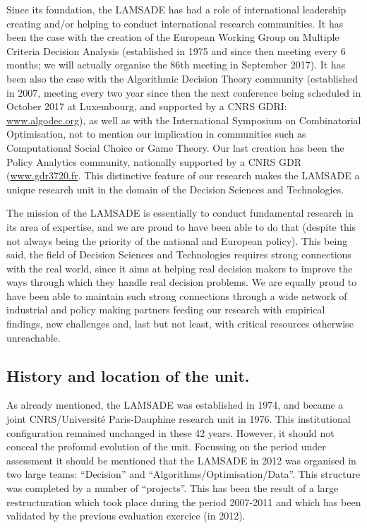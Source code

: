 Since its foundation, the LAMSADE has had a role of international leadership creating and/or helping to conduct international research communities. It has been the case with the creation of the European Working Group on Multiple Criteria Decision Analysis (established in 1975 and since then meeting every 6 months; we will actually organise the 86th meeting in September 2017). It has been also the case with the Algorithmic Decision Theory community (established in 2007,  meeting every two year since then the next conference being scheduled in October 2017 at Luxembourg, and supported by a CNRS GDRI: \url{www.algodec.org}), as well as with the International Symposium on Combinatorial Optimisation, not to mention our implication in communities such as Computational Social Choice or Game Theory. Our last creation has been the Policy Analytics community, nationally supported by a CNRS GDR (\url{www.gdr3720.fr}. This distinctive feature of our research makes the LAMSADE a unique research unit in the domain of the Decision Sciences and Technologies.

The mission of the LAMSADE is essentially to conduct fundamental research in its area of expertise, and we are proud to have been able to do that (despite this not always being the priority of the national and European policy). This being said, the field of Decision Sciences and Technologies requires strong connections with the real world, since it aims at helping real decision makers to improve the ways through which they handle real decision problems. We are equally proud to have been able to maintain such strong connections through a wide network of industrial and policy making partners feeding our research with empirical findings, new challenges and, last but not least, with critical resources otherwise unreachable.

\subsection{History and location of the unit.}\label{history}

As already mentioned, the LAMSADE was established in 1974, and became a joint CNRS/Université Paris-Dauphine research unit in 1976. This institutional configuration remained unchanged in these 42 years. However, it should not conceal the profound evolution of the unit. Focussing on the period under assessment it should be mentioned that the LAMSADE in 2012 was organised in two large teams: ``Decision'' and ``Algorithms/Optimisation/Data''. This structure was completed by a number of ``projects''. This has been the result of a large restructuration which took place during the period 2007-2011 and which has been validated by the previous evaluation exercice (in 2012).

